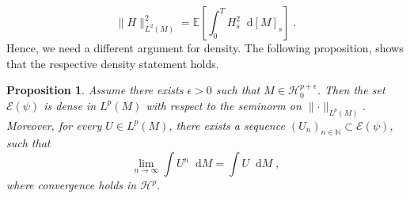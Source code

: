 \documentclass[11pt]{report}
\newcommand{\diff}{\mathop{}\!\mathrm{d}}
\theoremstyle{plain} %
\newtheorem{proposition}[proposition]{Proposition}
\theoremstyle{definition} %
\theoremstyle{remark} %
\begin{document}
\begin{equation}
    \lVert H\rVert_{L^2(M)}^2=\mathbb{E}[\int_0^T H_s^2\diff [M]_s]\;.
\end{equation}
Hence, we need a different argument for density. The following proposition, shows that the respective density statement holds.
\begin{proposition}\label{prop:Lp(M) density of E(psi)}
    Assume there exists \(\epsilon>0\) such that \(M\in\mathcal{H}_0^{p+\epsilon}\). Then the set \(\mathcal{E}(\psi)\) is dense in \(L^p(M)\) with respect to the seminorm on \(\lVert\cdot\rVert_{L^p(M)}\). Moreover, for every \(U\in L^p(M)\), there exists a sequence \((U_n)_{n\in\mathbb{N}}\subset\mathcal{E}(\psi)\), such that
    \begin{equation}
        \lim_{n\to\infty}\int U^n\diff M=\int U\diff M\;,
    \end{equation}
    where convergence holds in \(\mathcal{H}^p\). 
\end{proposition}
\end{document}

